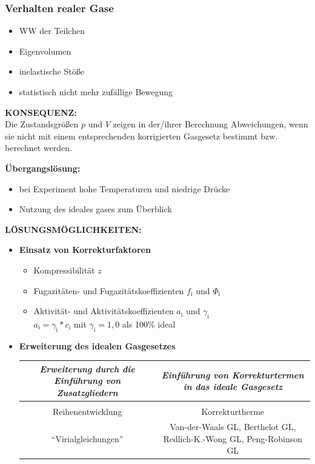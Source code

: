 \subsubsection{Verhalten realer Gase}

\begin{itemize}
	\item WW der Teilchen
	\item Eigenvolumen
	\item inelastische Stöße
	\item statistisch nicht mehr zufällige Bewegung
\end{itemize}

\textbf{KONSEQUENZ:}\\
Die Zustandsgrößen $p$ und $V$ zeigen in der/ihrer Berechnung Abweichungen, wenn sie nicht mit einem entsprechenden korrigierten Gasgesetz bestimmt bzw. berechnet werden.

\begin{center}
	\textbf{Übergangslösung:}
	\begin{itemize}
		\centering
		\item bei Experiment hohe Temperaturen und niedrige Drücke
		\item Nutzung des ideales gases zum Überblick
	\end{itemize}
\end{center}

\newpage

\textbf{LÖSUNGSMÖGLICHKEITEN:}
\begin{itemize}
	\item \textbf{Einsatz von Korrekturfaktoren}
	\begin{itemize}
		\item Kompressibilität $z$
		\item Fugazitäten- und Fugazitätskoeffizienten $f_{\text{i}}$ und $\Phi_{\text{i}}$
		\item Aktivität- und Aktivitätskoeffizienten $a_{\text{i}}$ und  $\gamma_{\text{i}}$\\
			$a_{\text{i}}=\gamma_{\text{i}}*c_{\text{i}}$ mit $\gamma_{\text{i}}=1,0$ als 100\% ideal
	\end{itemize}
	
	\item \textbf{Erweiterung des idealen Gasgesetzes}
	\renewcommand{\arraystretch}{1.2}
	\begin{table}[h!]
		\centering
		\begin{tabulary}{\textwidth}{C|C}
			\textit{Erweiterung durch die Einführung von Zusatzgliedern} & \textit{Einführung von Korrekturtermen in das ideale Gasgesetz} \\
			\hline
			&\\
			Reihenentwicklung & Korrekturtherme\\
			"`Virialgleichungen"'& Van-der-Waals GL, Berthelot GL, Redlich-K.-Wong GL, Peng-Robinson GL
		\end{tabulary} 
	\end{table}
	\FloatBarrier
\end{itemize}








